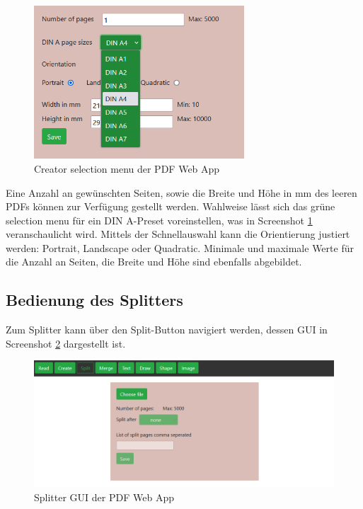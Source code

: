 \begin{figure}[!htbp]
	\centering
	\includegraphics[width=0.7\textwidth]{"images/creator-sel.png"}
	\caption{Creator selection menu der PDF Web App}
	\label{fig:creator-sel}
\end{figure}

Eine Anzahl an gewünschten Seiten, sowie die Breite und Höhe in mm des leeren PDFs können zur Verfügung gestellt werden. Wahlweise lässt sich das grüne selection menu für ein DIN A-Preset voreinstellen, was in Screenshot \ref{fig:creator-sel} veranschaulicht wird. Mittels der Schnellauswahl kann die Orientierung justiert werden: Portrait, Landscape oder Quadratic. Minimale und maximale Werte für die Anzahl an Seiten, die Breite und Höhe sind ebenfalls abgebildet. 

\subsection{Bedienung des Splitters}
Zum Splitter kann über den Split-Button navigiert werden, dessen GUI in Screenshot \ref{fig:splitter} dargestellt ist.

\begin{figure}[!htbp]
	\centering
	\includegraphics[width=1\textwidth]{"images/splitter.png"}
	\caption{Splitter GUI der PDF Web App}
	\label{fig:splitter}
\end{figure}

